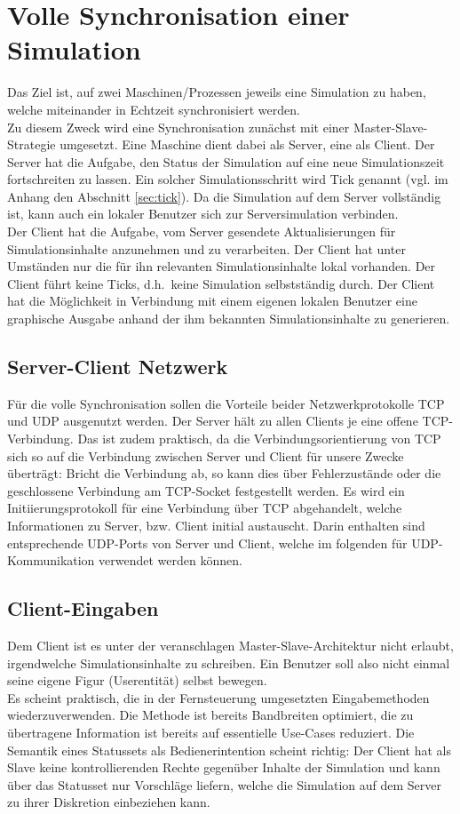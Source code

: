 \section{Volle Synchronisation einer Simulation}
Das Ziel ist, auf zwei Maschinen/Prozessen jeweils eine Simulation zu haben, welche miteinander in Echtzeit synchronisiert werden.\\
Zu diesem Zweck wird eine Synchronisation zunächst mit einer Master-Slave-Strategie umgesetzt. Eine Maschine dient dabei als Server, eine als Client.
Der Server hat die Aufgabe, den Status der Simulation auf eine neue Simulationszeit fortschreiten zu lassen. Ein solcher Simulationsschritt wird Tick genannt (vgl. im Anhang den Abschnitt \ref{sec:tick}). Da die Simulation auf dem Server vollständig ist, kann auch ein lokaler Benutzer sich zur Serversimulation verbinden.\\
Der Client hat die Aufgabe, vom Server gesendete Aktualisierungen für Simulationsinhalte anzunehmen und zu verarbeiten. Der Client hat unter Umständen nur die für ihn relevanten Simulationsinhalte lokal vorhanden. Der Client führt keine Ticks, d.h.~keine Simulation selbstständig durch. Der Client hat die Möglichkeit in Verbindung mit einem eigenen lokalen Benutzer eine graphische Ausgabe anhand der ihm bekannten Simulationsinhalte zu generieren. 

\subsection{Server-Client Netzwerk}
Für die volle Synchronisation sollen die Vorteile beider Netzwerkprotokolle TCP und UDP ausgenutzt werden. Der Server hält zu allen Clients je eine offene TCP-Verbindung. Das ist zudem praktisch, da die Verbindungsorientierung von TCP sich so auf die Verbindung zwischen Server und Client für unsere Zwecke überträgt: Bricht die Verbindung ab, so kann dies über Fehlerzustände oder die geschlossene Verbindung am TCP-Socket festgestellt werden.
Es wird ein Initiierungsprotokoll für eine Verbindung über TCP abgehandelt, welche Informationen zu Server, bzw. Client initial austauscht. Darin enthalten sind entsprechende UDP-Ports von Server und Client, welche im folgenden für UDP-Kommunikation verwendet werden können.\\

\subsection{Client-Eingaben}
Dem Client ist es unter der veranschlagen Master-Slave-Architektur nicht erlaubt, irgendwelche Simulationsinhalte zu schreiben. Ein Benutzer soll also nicht einmal seine eigene Figur (Userentität) selbst bewegen.\\
Es scheint praktisch, die in der Fernsteuerung umgesetzten Eingabemethoden wiederzuverwenden. Die Methode ist bereits Bandbreiten optimiert, die zu übertragene Information ist bereits auf essentielle Use-Cases reduziert. Die Semantik eines Statussets als Bedienerintention scheint richtig: Der Client hat als Slave keine kontrollierenden Rechte gegenüber Inhalte der Simulation und kann über das Statusset nur Vorschläge liefern, welche die Simulation auf dem Server zu ihrer Diskretion einbeziehen kann.

